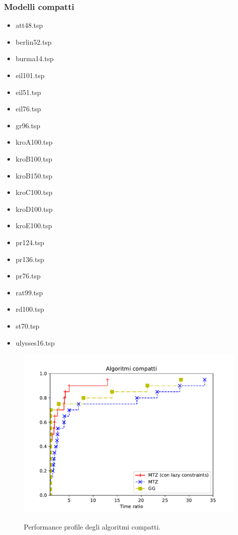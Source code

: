 \subsubsection{Modelli compatti}
\begin{center}
\begin{multicols}{3}
\begin{itemize}
\item{att48.tsp}
\item{berlin52.tsp}
\item{burma14.tsp}
\item{eil101.tsp}
\item{eil51.tsp}
\item{eil76.tsp}
\item{gr96.tsp}
\item{kroA100.tsp}
\item{kroB100.tsp}
\item{kroB150.tsp}
\item{kroC100.tsp}
\item{kroD100.tsp}
\item{kroE100.tsp}
\item{pr124.tsp}
\item{pr136.tsp}
\item{pr76.tsp}
\item{rat99.tsp}
\item{rd100.tsp}
\item{st70.tsp}
\item{ulysses16.tsp}
\end{itemize}
\end{multicols}
\end{center}

\begin{figure}[h] 
\begin{center} 
  \includegraphics[scale=0.8]{Images/pp_compact}\\ 
  \caption{\footnotesize{Performance profile degli algoritmi compatti.}}
  \label{perf_profile} 
\end{center} 
\end{figure}

